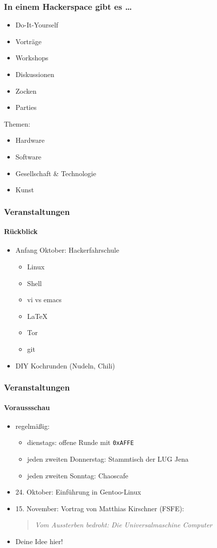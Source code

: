 \documentclass[english,compress,handout]{beamer}
\begin{document}
\begin{center}
\begin{frame}
	\frametitle{In einem Hackerspace gibt es \ldots}
	\begin{itemize}
		\item Do-It-Yourself
		\item Vorträge
		\item Workshops
		\item Diskussionen
		\item Zocken
		\item Parties
	\end{itemize}
	\pause
	\vfill
    Themen:
	\vfill
	\begin{itemize}
		\item Hardware
		\item Software
		\item Gesellschaft \& Technologie
		\item Kunst
	\end{itemize}
\end{frame}

\begin{frame}
	\frametitle{Veranstaltungen}
	\framesubtitle{Rückblick}
	\begin{itemize}
		\item Anfang Oktober: Hackerfahrschule 
			\begin{itemize}
				\item Linux
				\item Shell
				\item vi vs emacs
				\item \LaTeX{}
				\item Tor
				\item git
			\end{itemize}
		\item DIY Kochrunden (Nudeln, Chili)
	\end{itemize}
\end{frame}

\begin{frame}
	\frametitle{Veranstaltungen}
	\framesubtitle{Voraussschau}
	\begin{itemize}
		\item regelmäßig:
			\begin{itemize}
				\item dienstags: offene Runde mit \texttt{0xAFFE}
				\item jeden zweiten Donnerstag: Stammtisch der LUG Jena
				\item jeden zweiten Sonntag: Chaoscafe
			\end{itemize}
		\item 24. Oktober: Einführung in Gentoo-Linux
		\item 15. November: Vortrag von Matthias Kirschner (FSFE):  \\
			\begin{quote}
				\textit{Vom Aussterben bedroht: Die Universalmaschine Computer}
			\end{quote}
		\item Deine Idee hier!
	\end{itemize}	
\end{frame}


\end{center}
\end{document}
